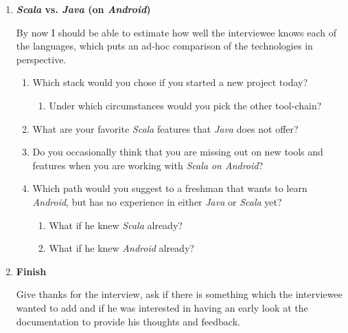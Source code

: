 \begin{enumerate}
\begin{enumerate}
\begin{enumerate}
		\end{enumerate}

	\end{enumerate}

	\item \textbf{\textit{Scala} vs. \textit{Java} (on \textit{Android})}

	By now I should be able to estimate how well the interviewee knows each of the languages, which puts an ad-hoc comparison of the technologies in perspective.

	\begin{enumerate}

		\item Which stack would you chose if you started a new project today?

		\begin{enumerate}

			\item Under which circumstances would you pick the other tool-chain?

		\end{enumerate}

		\item What are your favorite \textit{Scala} features that \textit{Java} does not offer?

		\item Do you occasionally think that you are missing out on new tools and features when you are working with \textit{Scala on Android}?

		\item Which path would you suggest to a freshman that wants to learn \textit{Android}, but has no experience in either \textit{Java} or \textit{Scala} yet?

		\begin{enumerate}

			\item What if he knew \textit{Scala} already?

			\item What if he knew \textit{Android} already?

		\end{enumerate}

	\end{enumerate}

	\item \textbf{Finish}

	Give thanks for the interview, ask if there is something which the interviewee wanted to add and if he was interested in having an early look at the documentation to provide his thoughts and feedback.

\end{enumerate}